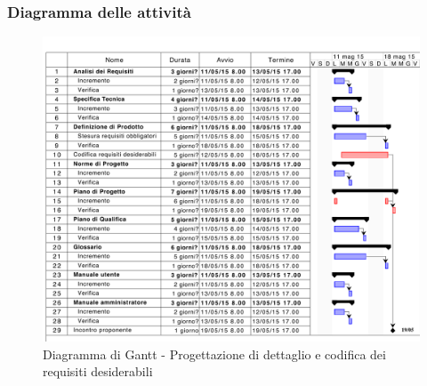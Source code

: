 		\subsubsection{Diagramma delle attività} %
		\label{ssub:diagramma_delle_attivita}
			\begin{figure}[htbp]
				\centering
				\centerline{\includegraphics[scale=0.7]{images/d_attivita_prog_dett_cod_des.pdf}}
				\caption{Diagramma di Gantt - Progettazione di dettaglio e codifica dei requisiti desiderabili}
				\label{fig:gantt_prog_dett_cod_requisiti_desiderabili}
			\end{figure}
	

